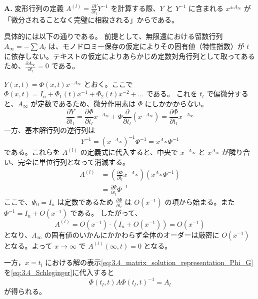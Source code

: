 \begin{Q}[無限遠 $x=\infty$ における展開の仮定から、なぜ $A_\infty$ の固有値に依存することなく、直ちに $A^{(l)}(\infty,t) = 0$ が導かれるのか？]
\textbf{A.} 変形行列の定義 $A^{(l)} = \frac{\partial Y}{\partial t_l}Y^{-1}$ を計算する際、$Y$ と $Y^{-1}$ に含まれる $x^{\pm A_\infty}$ が「微分されることなく完璧に相殺される」からである。

具体的には以下の通りである。
前提として、無限遠における留数行列 $A_\infty = -\sum A_l$ は、モノドロミー保存の仮定によりその固有値（特性指数）が $t$ に依存しない。テキストの仮定によりあらかじめ定数対角行列として取ってあるため、$\frac{\partial A_\infty}{\partial t_l} = 0$ である。

$Y(x,t) = \Phi(x,t)x^{-A_\infty}$ とおく。ここで $\Phi(x,t) = I_n + \Phi_1(t)x^{-1} + \Phi_2(t)x^{-2} + \dots$ である。
これを $t_l$ で偏微分すると、$A_\infty$ が定数であるため、微分作用素は $\Phi$ にしかかからない。
\[
  \frac{\partial Y}{\partial t_l} = \frac{\partial \Phi}{\partial t_l} x^{-A_\infty} + \Phi \frac{\partial}{\partial t_l}(x^{-A_\infty}) = \frac{\partial \Phi}{\partial t_l} x^{-A_\infty}
\]
一方、基本解行列の逆行列は
\[
  Y^{-1} = (x^{-A_\infty})^{-1} \Phi^{-1} = x^{A_\infty} \Phi^{-1}
\]
である。これらを $A^{(l)}$ の定義式に代入すると、中央で $x^{-A_\infty}$ と $x^{A_\infty}$ が隣り合い、完全に単位行列となって消滅する。
\begin{align*}
  A^{(l)} &= \left( \frac{\partial \Phi}{\partial t_l} x^{-A_\infty} \right) \left( x^{A_\infty} \Phi^{-1} \right) \\
  &= \frac{\partial \Phi}{\partial t_l} \Phi^{-1}
\end{align*}
ここで、$\Phi_0 = I_n$ は定数であるため $\frac{\partial \Phi}{\partial t_l}$ は $O(x^{-1})$ の項から始まる。また $\Phi^{-1} = I_n + O(x^{-1})$ である。
したがって、
\[
  A^{(l)} = O(x^{-1}) \cdot (I_n + O(x^{-1})) = O(x^{-1})
\]
となり、$A_\infty$ の固有値のいかんにかかわらず全体のオーダーは厳密に $O(x^{-1})$ となる。よって $x \to \infty$ で $A^{(l)}(\infty, t) = 0$ となる。
\end{Q}

一方，$x=t_l$ における解の表示\eqref{eq:3.4_matrix_solution_representation_Phi_G}を\eqref{eq:3.4_Schleginger}に代入すると
\[
  \Phi(t_l, t) A \Phi(t_l, t)^{-1} = A_l
\]
が得られる。

